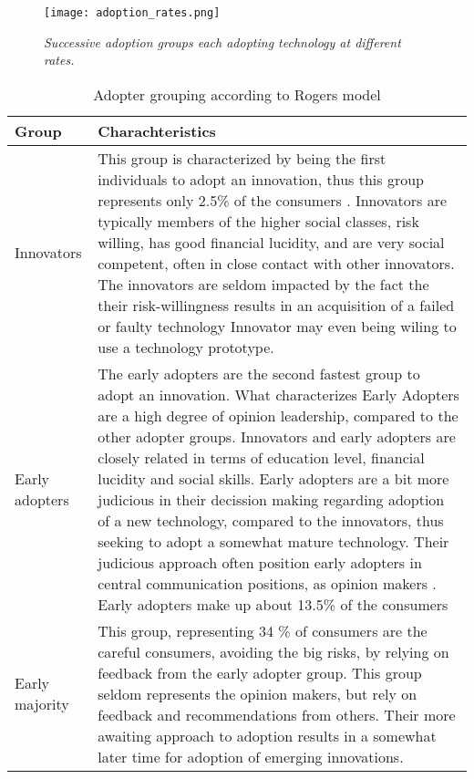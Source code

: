 \documentclass[journal]{IEEEtran}
\begin{document}
\begin{figure}
\texttt{[image: adoption\_rates.png]}
\caption{\textit{Successive adoption groups each adopting technology at different rates.}}			
\end{figure}
\label{fig:adoption} %


\begin{table}[ht]

\caption{Adopter grouping according to Rogers model} %
\centering  %

\begin{tabular}{|p{2cm} |p{5.5cm}|} %
\hline\hline                        %

Group & Charachteristics\\ [0.5ex] %
\hline                  %

Innovators &			%
This group is characterized by being the first individuals to adopt 
an innovation, thus this group represents only 2.5\% of the consumers \cite{diffusion2}. 
Innovators are typically members of the higher social classes, 
risk willing, has good financial lucidity, and are very social competent, 
often in close contact with other innovators. 
The innovators are seldom impacted by the fact the their risk-willingness results in an acquisition of a failed or faulty technology \cite{rogers_model} 
Innovator may even being wiling to use a technology prototype.  \\ %
\hline

Early adopters & 
The early adopters are the second fastest group to adopt an innovation. What characterizes Early Adopters are a high degree of opinion leadership, compared to the other adopter groups. Innovators and early adopters are closely related in terms of education level, financial lucidity and social skills. Early adopters are a bit more judicious in their decission making regarding adoption of a new technology, compared to the innovators, thus seeking to adopt a somewhat mature technology. Their judicious approach often position early adopters in central communication positions, as opinion makers \cite{rogers_model}.
Early adopters make up about 13.5\% of the consumers \cite{diffusion2} \\
\hline

Early majority &  
This group, representing 34 \% of consumers \cite{diffusion2} are the careful consumers, avoiding the big risks, by relying on feedback from the early adopter group. 
This group seldom represents the opinion makers, but rely on feedback and recommendations from others. Their more awaiting approach to adoption results in a somewhat later time for adoption of emerging innovations\cite{rogers_model}.\\
\hline


\end{tabular}
\end{table}
\end{document}
